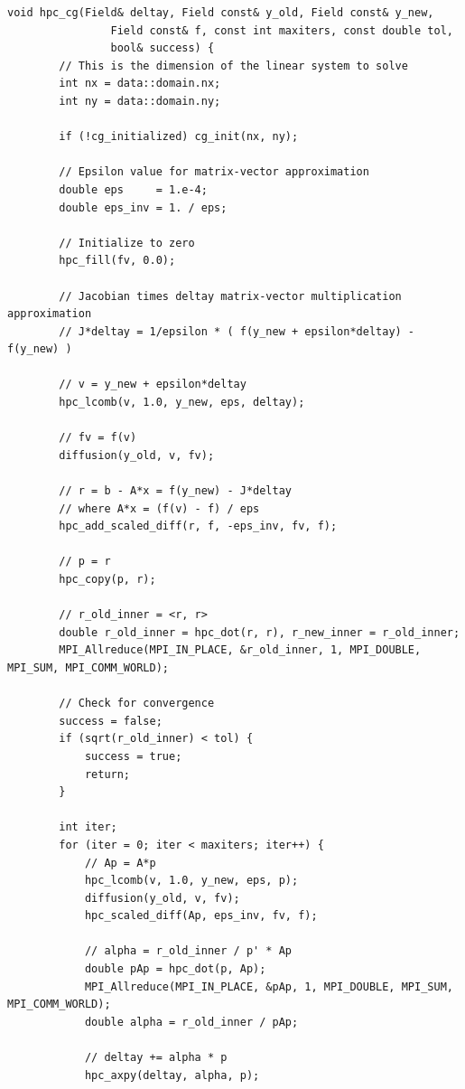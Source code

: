 \documentclass[unicode,11pt,a4paper,oneside,numbers=endperiod,openany]{scrartcl}
\begin{document}
\begin{lstlisting}[style=mystyle, language=MyC++, caption={Implementation of \texttt{hpc\_cg} for Conjugate Gradient Method}]
    void hpc_cg(Field& deltay, Field const& y_old, Field const& y_new,
                Field const& f, const int maxiters, const double tol,
                bool& success) {
        // This is the dimension of the linear system to solve
        int nx = data::domain.nx;
        int ny = data::domain.ny;
    
        if (!cg_initialized) cg_init(nx, ny);
    
        // Epsilon value for matrix-vector approximation
        double eps     = 1.e-4;
        double eps_inv = 1. / eps;
    
        // Initialize to zero
        hpc_fill(fv, 0.0);
    
        // Jacobian times deltay matrix-vector multiplication approximation
        // J*deltay = 1/epsilon * ( f(y_new + epsilon*deltay) - f(y_new) )
    
        // v = y_new + epsilon*deltay
        hpc_lcomb(v, 1.0, y_new, eps, deltay);
    
        // fv = f(v)
        diffusion(y_old, v, fv);
    
        // r = b - A*x = f(y_new) - J*deltay
        // where A*x = (f(v) - f) / eps
        hpc_add_scaled_diff(r, f, -eps_inv, fv, f);
    
        // p = r
        hpc_copy(p, r);
    
        // r_old_inner = <r, r>
        double r_old_inner = hpc_dot(r, r), r_new_inner = r_old_inner;
        MPI_Allreduce(MPI_IN_PLACE, &r_old_inner, 1, MPI_DOUBLE, MPI_SUM, MPI_COMM_WORLD);
    
        // Check for convergence
        success = false;
        if (sqrt(r_old_inner) < tol) {
            success = true;
            return;
        }
    
        int iter;
        for (iter = 0; iter < maxiters; iter++) {
            // Ap = A*p
            hpc_lcomb(v, 1.0, y_new, eps, p);
            diffusion(y_old, v, fv);
            hpc_scaled_diff(Ap, eps_inv, fv, f);
    
            // alpha = r_old_inner / p' * Ap
            double pAp = hpc_dot(p, Ap);
            MPI_Allreduce(MPI_IN_PLACE, &pAp, 1, MPI_DOUBLE, MPI_SUM, MPI_COMM_WORLD);
            double alpha = r_old_inner / pAp;
    
            // deltay += alpha * p
            hpc_axpy(deltay, alpha, p);
    

\end{lstlisting}
\end{document}
